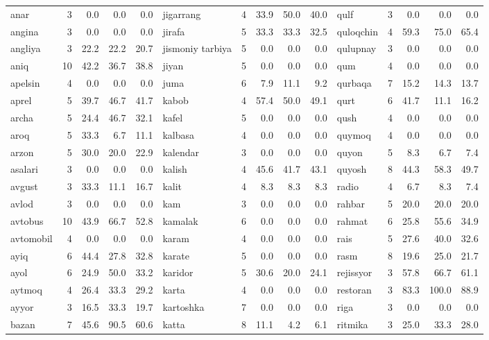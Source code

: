 \documentclass[a4paper,10pt]{article}
\begin{document}
\begin{longtable}{lrrrr|lrrrr|lrrrr}
anar & 3 & 0.0 & 0.0 & 0.0 & jigarrang & 4 & 33.9 & 50.0 & 40.0 & qulf & 3 & 0.0 & 0.0 & 0.0 \\
angina & 3 & 0.0 & 0.0 & 0.0 & jirafa & 5 & 33.3 & 33.3 & 32.5 & quloqchin & 4 & 59.3 & 75.0 & 65.4 \\
angliya & 3 & 22.2 & 22.2 & 20.7 & jismoniy tarbiya & 5 & 0.0 & 0.0 & 0.0 & qulupnay & 3 & 0.0 & 0.0 & 0.0 \\
aniq & 10 & 42.2 & 36.7 & 38.8 & jiyan & 5 & 0.0 & 0.0 & 0.0 & qum & 4 & 0.0 & 0.0 & 0.0 \\
apelsin & 4 & 0.0 & 0.0 & 0.0 & juma & 6 & 7.9 & 11.1 & 9.2 & qurbaqa & 7 & 15.2 & 14.3 & 13.7 \\
aprel & 5 & 39.7 & 46.7 & 41.7 & kabob & 4 & 57.4 & 50.0 & 49.1 & qurt & 6 & 41.7 & 11.1 & 16.2 \\
archa & 5 & 24.4 & 46.7 & 32.1 & kafel & 5 & 0.0 & 0.0 & 0.0 & qush & 4 & 0.0 & 0.0 & 0.0 \\
aroq & 5 & 33.3 & 6.7 & 11.1 & kalbasa & 4 & 0.0 & 0.0 & 0.0 & quymoq & 4 & 0.0 & 0.0 & 0.0 \\
arzon & 5 & 30.0 & 20.0 & 22.9 & kalendar & 3 & 0.0 & 0.0 & 0.0 & quyon & 5 & 8.3 & 6.7 & 7.4 \\
asalari & 3 & 0.0 & 0.0 & 0.0 & kalish & 4 & 45.6 & 41.7 & 43.1 & quyosh & 8 & 44.3 & 58.3 & 49.7 \\
avgust & 3 & 33.3 & 11.1 & 16.7 & kalit & 4 & 8.3 & 8.3 & 8.3 & radio & 4 & 6.7 & 8.3 & 7.4 \\
avlod & 3 & 0.0 & 0.0 & 0.0 & kam & 3 & 0.0 & 0.0 & 0.0 & rahbar & 5 & 20.0 & 20.0 & 20.0 \\
avtobus & 10 & 43.9 & 66.7 & 52.8 & kamalak & 6 & 0.0 & 0.0 & 0.0 & rahmat & 6 & 25.8 & 55.6 & 34.9 \\
avtomobil & 4 & 0.0 & 0.0 & 0.0 & karam & 4 & 0.0 & 0.0 & 0.0 & rais & 5 & 27.6 & 40.0 & 32.6 \\
ayiq & 6 & 44.4 & 27.8 & 32.8 & karate & 5 & 0.0 & 0.0 & 0.0 & rasm & 8 & 19.6 & 25.0 & 21.7 \\
ayol & 6 & 24.9 & 50.0 & 33.2 & karidor & 5 & 30.6 & 20.0 & 24.1 & rejissyor & 3 & 57.8 & 66.7 & 61.1 \\
aytmoq & 4 & 26.4 & 33.3 & 29.2 & karta & 4 & 0.0 & 0.0 & 0.0 & restoran & 3 & 83.3 & 100.0 & 88.9 \\
ayyor & 3 & 16.5 & 33.3 & 19.7 & kartoshka & 7 & 0.0 & 0.0 & 0.0 & riga & 3 & 0.0 & 0.0 & 0.0 \\
ba\textquotesingle{}zan & 7 & 45.6 & 90.5 & 60.6 & katta & 8 & 11.1 & 4.2 & 6.1 & ritmika & 3 & 25.0 & 33.3 & 28.0 \\

\end{longtable}
\end{document}
